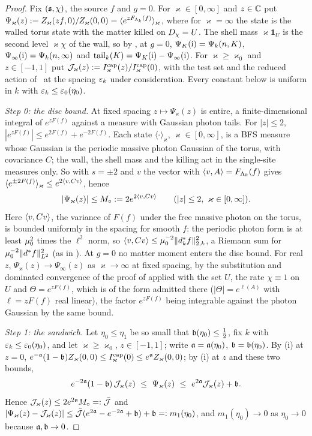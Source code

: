 \begin{proof}
Fix $(\mathfrak s,\chi)$, the source $f$ and $g=0$. For $\varkappa\in[0,\infty]$ and $z\in\mathbb C$ put $\Psi_\varkappa(z):= Z_\varkappa(zf,0)/Z_\varkappa(0,0)=\langle e^{zF_{\Lambda_k}(f)}\rangle_\varkappa$, where for $\varkappa=\infty$ the state is the walled torus state with the matter killed on $D_\chi=U$. The shell mass $\varkappa\mathbf 1_U$ is the second level $\varkappa\chi$ of the wall, so by , at $g=0$, $\Psi_K(\mathrm i)=\Psi_k(n,K)$, $\Psi_\infty(\mathrm i)=\Psi_k(n,\infty)$ and $\operatorname{tail}_k(K)=\Psi_K(\mathrm i)-\Psi_\infty(\mathrm i)$. For $\varkappa\ge\varkappa_0$ and $z\in[-1,1]$ put $\mathcal J_\varkappa(z):=I^{\mathrm{cap}}_\varkappa(z)/I^{\mathrm{cap}}_\varkappa(0)$, with the test set and the reduced action of \HS\ at the spacing $\varepsilon_k$ under consideration. Every constant below is uniform in $k$ with $\varepsilon_k\le\varepsilon_0(\eta_0)$.

\emph{Step 0: the disc bound.} At fixed spacing $z\mapsto\Psi_\varkappa(z)$ is entire, a finite-dimensional integral of $e^{zF(f)}$ against a measure with Gaussian photon tails. For $|z|\le2$, $|e^{zF(f)}|\le e^{2F(f)}+e^{-2F(f)}$. Each state $\langle\cdot\rangle_\varkappa$, $\varkappa\in[0,\infty]$, is a BFS measure whose Gaussian is the periodic massive photon Gaussian of the torus, with covariance $C$; the wall, the shell mass and the killing act in the single-site measures only. So  with $s=\pm2$ and $v$ the vector with $\langle v,A\rangle=F_{\Lambda_k}(f)$ gives $\langle e^{\pm2F(f)}\rangle_\varkappa\le e^{2\langle v,Cv\rangle}$, hence
\[
|\Psi_\varkappa(z)|\le M_\circ:=2e^{2\langle v,Cv\rangle}\qquad(|z|\le2,\ \varkappa\in[0,\infty]).
\]
Here $\langle v,Cv\rangle$, the variance of $F(f)$ under the free massive photon on the torus, is bounded uniformly in the spacing for smooth $f$: the periodic photon form is at least $\mu_0^2$ times the $\ell^2$ norm, so $\langle v,Cv\rangle\le\mu_0^{-2}\lVert d^{*}_kf\rVert^2_{2,k}$, a Riemann sum for $\mu_0^{-2}\lVert d^{*} f\rVert^2_{L^2}$ (as in ). At $g=0$ no matter moment enters the disc bound. For real $z$, $\Psi_\varkappa(z)\to\Psi_\infty(z)$ as $\varkappa\to\infty$ at fixed spacing, by the substitution and dominated convergence of the proof of  applied with the set $U$, the rate $\chi\equiv1$ on $U$ and $\Theta=e^{zF(f)}$, which is of the form admitted there ($|\Theta|=e^{\ell(A)}$ with $\ell=zF(f)$ real linear), the factor $e^{zF(f)}$ being integrable against the photon Gaussian by the same bound.

\emph{Step 1: the sandwich.} Let $\eta_0\le\eta_1$ be so small that $\mathfrak b(\eta_0)\le\frac12$, fix $k$ with $\varepsilon_k\le\varepsilon_0(\eta_0)$, and let $\varkappa\ge\varkappa_0$, $z\in[-1,1]$; write $\mathfrak a=\mathfrak a(\eta_0)$, $\mathfrak b=\mathfrak b(\eta_0)$. By \HS(i) at $z=0$, $e^{-\mathfrak a}(1-\mathfrak b)Z_\varkappa(0,0)\le I^{\mathrm{cap}}_\varkappa(0)\le e^{\mathfrak a}Z_\varkappa(0,0)$; by \HS(i) at $z$ and these two bounds,
\[
e^{-2\sfa}(1-\sfb)\,\cJ_\varkappa(z)\ \le\ \Psi_\varkappa(z)\ \le\ e^{2\sfa}\cJ_\varkappa(z)+\sfb .
\]
Hence $\mathcal J_\varkappa(z)\le2e^{2\mathfrak a}M_\circ=:\bar{\mathcal J}$ and $|\Psi_\varkappa(z)-\mathcal J_\varkappa(z)|\le\bar{\mathcal J}(e^{2\mathfrak a}-e^{-2\mathfrak a}+\mathfrak b)+\mathfrak b=: m_1(\eta_0)$, and $m_1(\eta_0)\to0$ as $\eta_0\to0$ because $\mathfrak a,\mathfrak b\to0$.


\end{proof}
